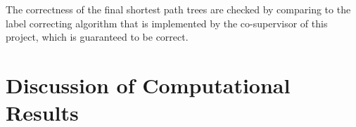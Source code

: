 The correctness of the final shortest path trees are checked by comparing to the label correcting algorithm that is implemented by the co-supervisor of this project, which is guaranteed to be correct.

\section{Discussion of Computational Results}

